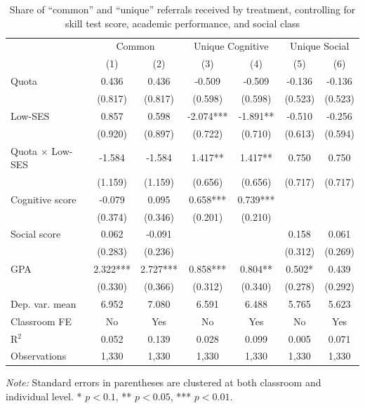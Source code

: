 \documentclass[11pt,a4paper,oneside]{article}
\begin{document}
  \begin{table}[H]
    \centering
    \begin{threeparttable}
    \caption{Share of ``common'' and ``unique'' referrals received by treatment, controlling for skill test score, academic performance, and social class}
    \label{tab:twice_treat}
    \begin{tabular*}{\textwidth}{@{\extracolsep{\fill}}l c c c c c c@{}}
    \toprule
    & \multicolumn{2}{c}{Common} & \multicolumn{2}{c}{Unique Cognitive} & \multicolumn{2}{c}{Unique Social} \\
    & (1) & (2) & (3) & (4) & (5) & (6) \\
    \midrule
    Quota & 0.436 & 0.436 & -0.509 & -0.509 & -0.136 & -0.136 \\
    & (0.817) & (0.817) & (0.598) & (0.598) & (0.523) & (0.523) \\
    Low-SES & 0.857 & 0.598 & -2.074*** & -1.891** & -0.510 & -0.256 \\
    & (0.920) & (0.897) & (0.722) & (0.710) & (0.613) & (0.594) \\
    Quota × Low-SES & -1.584 & -1.584 & 1.417** & 1.417** & 0.750 & 0.750 \\
    & (1.159) & (1.159) & (0.656) & (0.656) & (0.717) & (0.717) \\
    Cognitive score & -0.079 & 0.095 & 0.658*** & 0.739*** & & \\
    & (0.374) & (0.346) & (0.201) & (0.210) & & \\
    Social score & 0.062 & -0.091 & & & 0.158 & 0.061 \\
    & (0.283) & (0.236) & & & (0.312) & (0.269) \\
    GPA & 2.322*** & 2.727*** & 0.858*** & 0.804** & 0.502* & 0.439 \\
    & (0.330) & (0.366) & (0.312) & (0.340) & (0.278) & (0.292) \\
    \midrule
    Dep. var. mean & 6.952 & 7.080 & 6.591 & 6.488 & 5.765 & 5.623 \\
    Classroom FE & No & Yes & No & Yes & No & Yes \\
    R$^2$ & 0.052 & 0.139 & 0.028 & 0.099 & 0.005 & 0.071 \\
    Observations & 1,330 & 1,330 & 1,330 & 1,330 & 1,330 & 1,330 \\
    \bottomrule
    \end{tabular*}
    \begin{tablenotes}[flushleft]
    \footnotesize
    \item[] \textit{Note:} Standard errors in parentheses are clustered at both classroom and individual level. * $p < 0.1$, ** $p < 0.05$, *** $p < 0.01$. 

\end{tablenotes}
\end{threeparttable}
\end{table}
\end{document}
